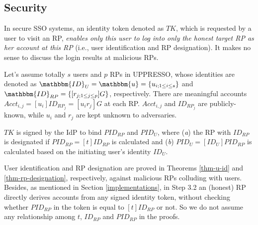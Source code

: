 

\subsection{Security}
\label{analysis-security}

In secure SSO systems, an identity token denoted as $TK$, which is requested by a user to visit an RP,
    \emph{enables only this user to log into only the honest target RP as her account at this RP} (i.e., user identification and RP designation). It makes no sense to discuss the login results at malicious RPs.

Let's assume totally $s$ users and $p$ RPs in UPPRESSO,
    whose identities are denoted as $\mathbbm{ID}_U = \mathbbm{u} = \{u_{i; 1 \leq i \leq s}\}$ and $\mathbbm{ID}_{RP} = \{[r_{j;1 \leq j \leq p}]G\}$, respectively.
There are meaningful accounts $Acct_{i,j}=[u_i]ID_{RP_j} = [u_i r_j]G$ at each RP.
$Acct_{i,j}$ and $ID_{RP_j}$ are publicly-known, while $u_{i}$ and $r_{j}$ are kept unknown to adversaries.

$TK$ is signed by the IdP to bind $PID_{RP}$ and $PID_U$,
where (\emph{a}) the RP with $ID_{RP}$ is designated if $PID_{RP} = [t]ID_{RP}$ is calculated
    and (\emph{b}) $PID_U = [ID_U]PID_{RP}$ is calculated based on the initiating user's identity $ID_U$.

User identification and RP designation are proved in Theorems \ref{thm-u-id} and \ref{thm-rp-designation}, respectively, against malicious RPs colluding with users.
Besides, as mentioned in Section \ref{implementations}, 
in Step 3.2 an (honest) RP directly derives accounts from any signed identity token, without checking whether $PID_{RP}$ in the token is equal to $[t]ID_{RP}$ or not.
So we do not assume any relationship among $t$, $ID_{RP}$ and $PID_{RP}$ in the proofs.


